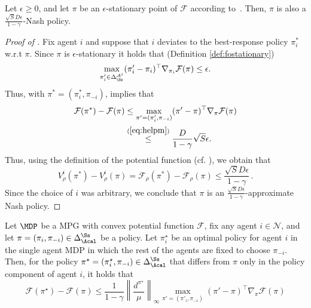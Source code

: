\begin{lemma}\label{lem:stationary} Let $\epsilon \geq 0$, and let $\pi$ be an $\epsilon$-stationary point of $\mathcal F$ according to~. Then, $\pi$ is also a $\frac{\sqrt{S}D\epsilon}{1-\gamma}$-Nash policy.
\end{lemma}

\begin{proof}[Proof of ]
Fix agent $i$ and suppose that $i$ deviates to the best-response policy $\pi^*_i$ w.r.t $\pi$. Since $\pi$ is $\epsilon$-stationary it holds that (Definition \ref{def:fostationary})
\begin{equation}\label{eq:helpm}
\max_{\pi'_i \in \Delta^{\mathcal{A}^i}_\Ss}(\pi'_i - \pi_i)^{\top} \nabla_{\pi_i} \mathcal F(\pi) \leq \epsilon.
\end{equation}
Thus, with $\pi^* = (\pi^*_i,\pi_{-i})$,  implies that
\begin{equation}\label{eq:almost}
\begin{split}
\mathcal F(\pi^*)-\mathcal F(\pi)&\le \max_{\pi'=(\pi'_i,\pi_{-i})}(\pi'-\pi)^\top \nabla_{\pi}\mathcal F(\pi)
\\&\stackrel{(\ref{eq:helpm})}{\leq}\frac{D}{1-\gamma}\sqrt{S}\epsilon.
\end{split}
\end{equation}
Thus, using the definition of the potential function (cf. ), we obtain that
\[
V^i_{\rho}(\pi^*)-V^i_{\rho}(\pi) =\mathcal F_{\rho}(\pi^*)-\mathcal F_{\rho}(\pi) \leq \frac{\sqrt{S}D \epsilon}{1-\gamma}\,.
\]
Since the choice of $i$ was arbitrary, we conclude that $\pi$ is an $\frac{\sqrt{S}D \epsilon}{1-\gamma}$-approximate Nash policy.
\end{proof}

\begin{lemma}\label{lem:gdom}
    Let $\MDP$ be a MPG with convex potential function $\mathcal F$, fix any agent $i \in \mathcal{N}$, and let $\pi=(\pi_i,\pi_{-i})\in \Delta_\Acal^\Ss$ be a policy. Let $\pi_i^\star$ be an optimal policy for agent $i$ in the single agent MDP in which the rest of the agents are fixed to choose $\pi_{-i}.$ Then, for the policy $\pi^\star=(\pi^\star_i,\pi_{-i}) \in \Delta_\Acal^\Ss$ that differs from $\pi$ only in the policy component of agent $i$, it holds that
    \begin{equation}
        \mathcal F(\pi^\star)-\mathcal F(\pi)\le \frac{1}{1-\gamma}\left \|\frac{d^{\pi^\star}}{\mu}\right\|_{\infty}\max_{\pi'=(\pi'_i,\pi_{-i})}(\pi'-\pi)^\top \nabla_{\pi}\mathcal F(\pi)
    \end{equation}
\end{lemma}



